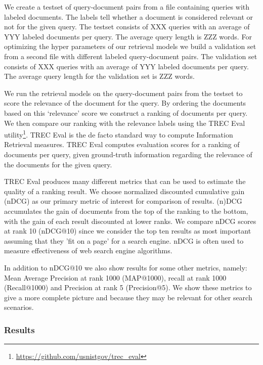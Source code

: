 We create a testset of query-document pairs from a file
containing queries with labeled documents. The labels tell whether
a document is considered relevant or not for the given query.
The testset consists of XXX queries with an average of 
YYY labeled documents per query. 
The average query length is ZZZ words.
%
For optimizing the hyper parameters of our retrieval models
we build a validation set from a second file with different 
labeled query-document pairs. 
The validation set consists of XXX queries with an average of 
YYY labeled documents per query. 
The average query length for the validation set is ZZZ words.


We run the retrieval models on the query-document pairs from the
testset to score the relevance of the document for the query.
By ordering the documents based on this `relevance' score
we construct a ranking of documents per query.
We then compare our ranking with the relevance labels using
the TREC Eval utility\footnote{\url{https://github.com/usnistgov/trec_eval}}. TREC Eval is the de facto standard way to compute Information Retrieval measures. TREC Eval computes evaluation scores
for a ranking of documents per query, given
ground-truth information regarding the relevance of the documents
for the given query. 

TREC Eval produces many different metrics that can be used 
to estimate the quality of a ranking result.
We choose normalized discounted cumulative gain (nDCG) as
our primary metric of interest for comparison of results.
(n)DCG accumulates the gain of documents from the top of the ranking
to the bottom, with the gain of each result discounted at lower ranks.
We compare nDCG scores at rank 10 (nDCG@10) since we consider the top ten results as most important assuming that they 'fit on a page' for a search engine. nDCG is often used to measure effectiveness of web search engine algorithms.

In addition to nDCG@10 we also show results for some other metrics,
namely: Mean Average Precision at rank 1000 (MAP@1000), 
recall at rank 1000 (Recall@1000) and Precision at rank 5 (Precision@5).
We show these metrics to give a more complete picture and because they
may be relevant for other search scenarios.


\subsubsection{Results}
\label{ResultsLexicalModels}

